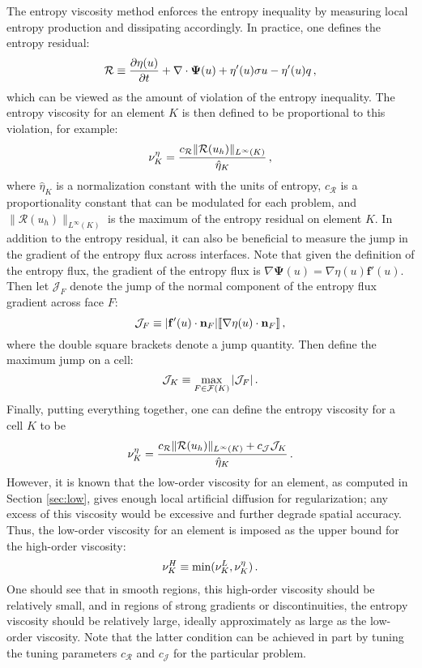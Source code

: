 The entropy viscosity method enforces the entropy inequality by measuring
local entropy production and dissipating accordingly. In practice, one
defines the entropy residual:
\begin{equation}
  \mathcal{R} \equiv \frac{\partial \eta(u)}{\partial t} + \nabla\cdot\mathbf{\Psi}(u)
    + \eta'(u)\sigma u - \eta'(u)q \,,
\end{equation}
which can be viewed as the amount of violation of the entropy inequality.
The entropy viscosity for an element $K$ is then defined to be proportional
to this violation, for example:
\begin{equation}
  \nu^\eta_K = \frac{c_\mathcal{R}\|\mathcal{R}(u_h)\|_{L^\infty(K)}}
    {\hat{\eta}_K}
    \,,
\end{equation}
where $\hat{\eta}_K$ is a normalization constant with the units of entropy,
$c_\mathcal{R}$ is a proportionality constant that can be modulated for
each problem, and $\|\mathcal{R}(u_h)\|_{L^\infty(K)}$ is the maximum of the
entropy residual on element $K$. In addition to the entropy residual, it can
also be beneficial to measure the jump in the gradient of the entropy flux
across interfaces.
Note that given the definition of the entropy flux, the gradient of the entropy
flux is $\nabla\mathbf{\Psi}(u)=\nabla\eta(u)\mathbf{f}'(u)$. Then let
$\mathcal{J}_F$ denote the jump of the normal component of the entropy flux
gradient across face $F$:
\begin{equation}
  \mathcal{J}_F \equiv |\mathbf{f}'(u)\cdot\mathbf{n}_F|
    [\![\nabla\eta(u)\cdot\mathbf{n}_F]\!] \,,
\end{equation}
where the double square brackets denote a jump quantity. Then define the
maximum jump on a cell:
\begin{equation}
  \mathcal{J}_K \equiv \max\limits_{F\in\mathcal{F}(K)} |\mathcal{J}_F| \,.
\end{equation}
Finally, putting everything together, one can define the entropy viscosity
for a cell $K$ to be
\begin{equation}
  \nu^\eta_K = \frac{c_\mathcal{R}\|\mathcal{R}(u_h)\|_{L^\infty(K)}
    + c_\mathcal{J}\mathcal{J}_K}{\hat{\eta}_K}
    \,.
\end{equation}
However, it is known that the low-order viscosity for an element, as computed
in Section \ref{sec:low}, gives enough local artificial diffusion for
regularization; any excess of this viscosity would be excessive and further
degrade spatial accuracy. Thus, the low-order viscosity for an element is
imposed as the upper bound for the high-order viscosity:
\begin{equation}
  \nu^H_K \equiv \min(\nu^L_K, \nu^\eta_K) \,.
\end{equation}
One should see that in smooth regions, this high-order viscosity should be
relatively small, and in regions of strong gradients or discontinuities,
the entropy viscosity should be relatively large, ideally approximately
as large as the low-order viscosity. Note that the latter condition can
be achieved in part by tuning the tuning parameters
$c_\mathcal{R}$ and $c_\mathcal{J}$ for the particular problem.
